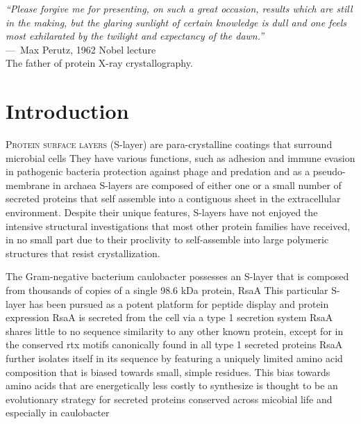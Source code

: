 \acresetall
{}
\begin{epigraph}
  \emph{``Please forgive me for presenting, on such a great occasion, results which are still in the making, but the glaring sunlight of certain knowledge is dull and one feels most exhilarated by the twilight and expectancy of the dawn.''} \\---~Max Perutz, 1962 Nobel lecture\\ The father of protein X-ray crystallography.
\end{epigraph}

\section{Introduction} %
\label{sec:crystal_introduction} 

\lettrine[lines=2]{P}{rotein surface layers} (\acs{S-layer}) are para-crystalline coatings that
surround microbial cells
 They have various functions, such as adhesion
and immune evasion in pathogenic bacteria
 protection against phage and predation
 and as a pseudo-membrane in archaea
 \acp{S-layer} are composed of either one or a small number of secreted proteins that self assemble
into a contiguous sheet in the extracellular environment. Despite their
unique features, \acp{S-layer} have not enjoyed the intensive structural
investigations that most other protein families have received, in no
small part due to their proclivity to self-assemble into large polymeric
structures that resist crystallization.

The Gram-negative bacterium \ac{caulobacter} possesses an
\ac{S-layer} that is composed from thousands of copies of a single 98.6 kDa protein, RsaA
 This particular \ac{S-layer} has been pursued as a potent platform for peptide display and
protein expression
RsaA is secreted from the cell via a type 1
secretion system
 RsaA shares little to no sequence similarity to any
other known protein, except for in the conserved \ac{rtx}
motifs canonically found in all type 1 secreted proteins
 RsaA further isolates itself in its sequence by featuring a uniquely limited amino
acid composition that is biased towards small, simple residues. This bias
towards  amino acids that are energetically less costly to synthesize is thought to be an evolutionary strategy
for secreted proteins conserved across micobial life and especially in
\ac{caulobacter}

